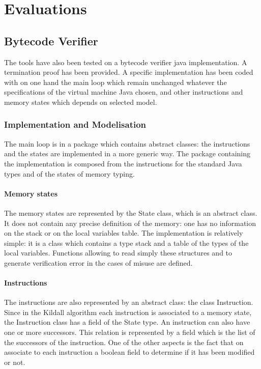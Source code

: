 \chapter{Evaluations}




\section{Bytecode Verifier}
The tools have also been tested on a bytecode verifier java implementation. A termination proof has been provided.
A specific implementation has been coded with on one hand the main loop which remain unchanged whatever the specifications of the virtual machine Java chosen, and other instructions and memory states which depends on selected model.
\subsection{Implementation and Modelisation}
The main loop is in a package which contains abstract classes: 
the instructions and the states are implemented in a more generic way.
The package containing the implementation is composed from the instructions for the standard Java types and of the states of memory typing. 
\subsubsection {Memory states}
The memory states are represented by the State class, which is an abstract class.  It does not contain any precise definition of the memory: 
one has no information on the stack or on the local variables table. 
The implementation is relatively simple: 
it is a class which contains a type stack and a table of the types of the local variables. 
Functions allowing to read simply these structures and to generate verification error in the cases of misuse are defined.   
\subsubsection{Instructions}
The instructions are also represented by an abstract class: 
the class Instruction.  
Since in the Kildall algorithm each instruction is associated to a memory state,  the Instruction class has a field of the State type. 
An instruction can also have one or more successors. 
This relation is represented by a field which is the list of the successors of the instruction.  
One of the other aspects is the fact that on associate to each instruction a boolean field to determine if it has been modified or not.

